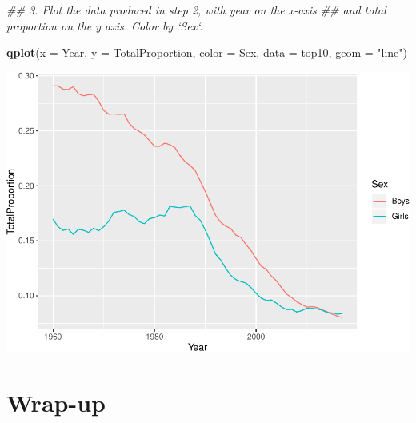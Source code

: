 \documentclass[]{book}
\newenvironment{Shaded}{\begin{snugshade}}{\end{snugshade}}
\newcommand{\CommentTok}[1]{\textcolor[rgb]{0.56,0.35,0.01}{\textit{#1}}}
\newcommand{\DataTypeTok}[1]{\textcolor[rgb]{0.13,0.29,0.53}{#1}}
\newcommand{\KeywordTok}[1]{\textcolor[rgb]{0.13,0.29,0.53}{\textbf{#1}}}
\newcommand{\NormalTok}[1]{#1}
\newcommand{\OperatorTok}[1]{\textcolor[rgb]{0.81,0.36,0.00}{\textbf{#1}}}
\newcommand{\StringTok}[1]{\textcolor[rgb]{0.31,0.60,0.02}{#1}}
\begin{document}
\begin{Shaded}
\end{Shaded}

\begin{Shaded}
\begin{Highlighting}[]
\CommentTok{## 3.  Plot the data produced in step 2, with year on the x-axis}
\CommentTok{##     and total proportion on the y axis. Color by `Sex`.}
\end{Highlighting}
\end{Shaded}

\begin{Shaded}
\begin{Highlighting}[]
\KeywordTok{qplot}\NormalTok{(}\DataTypeTok{x =}\NormalTok{ Year, }
      \DataTypeTok{y =}\NormalTok{ TotalProportion, }
      \DataTypeTok{color =}\NormalTok{ Sex,}
      \DataTypeTok{data =}\NormalTok{ top10,}
      \DataTypeTok{geom =} \StringTok{"line"}\NormalTok{)}
\end{Highlighting}
\end{Shaded}

\includegraphics{R/Rintro/figures/unnamed-chunk-88-1.pdf}

\hypertarget{wrap-up-1}{%
\section{Wrap-up}\label{wrap-up-1}}
\end{document}
